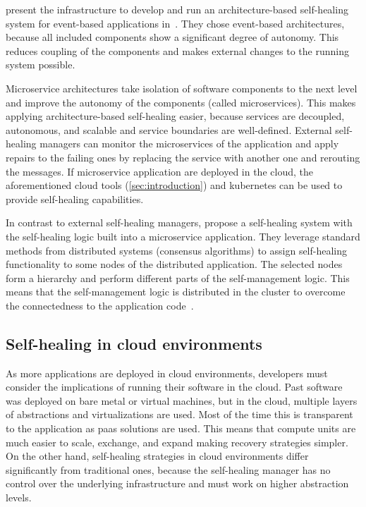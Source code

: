   \citeauthor{DashofyArchitecture} present the infrastructure to develop and run an architecture-based self-healing system for event-based applications in~\cite{DashofyArchitecture}.
  They chose event-based architectures, because all included components show a significant degree of autonomy.
  This reduces coupling of the components and makes external changes to the running system possible.

  Microservice architectures take isolation of software components to the next level and improve the autonomy of the components (called microservices).
  This makes applying architecture-based self-healing easier, because services are decoupled, autonomous, and scalable and service boundaries are well-defined.
  External self-healing managers can monitor the microservices of the application and apply repairs to the failing ones by replacing the service with another one and rerouting the messages.
  If microservice application are deployed in the cloud, the aforementioned cloud tools (\cref{sec:introduction}) and \gls{kubernetes} can be used to provide self-healing capabilities.

  In contrast to external self-healing managers, \citeauthor{ToffettiMicroservices} propose a self-healing system with the self-healing logic built into a microservice application.
  They leverage standard methods from distributed systems (\ie consensus algorithms) to assign self-healing functionality to some nodes of the distributed application.
  The selected nodes form a hierarchy and perform different parts of the self-management logic.
  This means that the self-management logic is distributed in the cluster to overcome the connectedness to the application code~\cite{ToffettiMicroservices}.

\subsection{Self-healing in cloud environments}\label{sec:self-healing:cloud}
  As more applications are deployed in cloud environments, developers must consider the implications of running their software in the cloud.
  Past software was deployed on bare metal or virtual machines, but in the cloud, multiple layers of abstractions and virtualizations are used.
  Most of the time this is transparent to the application as \gls{paas} solutions are used.
  This means that compute units are much easier to scale, exchange, and expand making recovery strategies simpler.
  On the other hand, self-healing strategies in cloud environments differ significantly from traditional ones, because the self-healing manager has no control over the underlying infrastructure and must work on higher abstraction levels.

